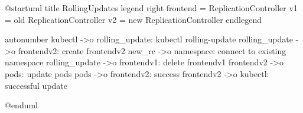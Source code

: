 @startuml
title RollingUpdates
legend right
  frontend = ReplicationController
  v1 = old ReplicationController
  v2 = new ReplicationController
endlegend

autonumber
kubectl ->o rolling_update: kubectl rolling-update
rolling_update ->o frontendv2: create frontendv2
new_rc ->o namespace: connect to existing namespace
rolling_update ->o frontendv1: delete frontendv1
frontendv2 ->o pods: update pods
pods ->o frontendv2: success
frontendv2 ->o kubectl: successful update

@enduml
